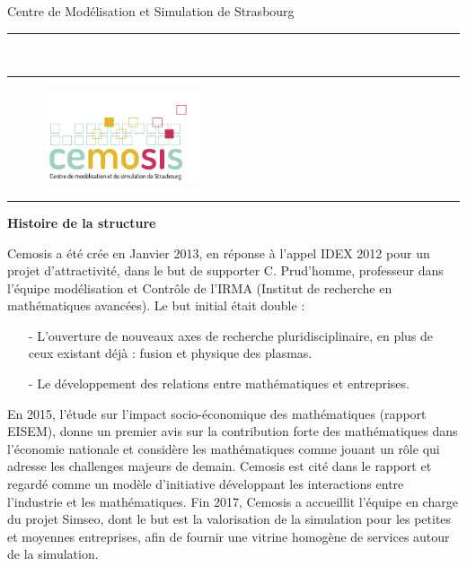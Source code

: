 \documentclass[10pt,a4paper]{article}
\newcommand{\HorRule}[1]{\noindent\rule{\linewidth}{#1}} %
\newcommand{\SepRule}{\noindent							 %
						\begin{center}
							\rule{250pt}{1pt}
						\end{center}
						}
\newcommand{\JournalName}[1]{%
		\begin{center}	
			\Huge 
			#1%
		\end{center}	
		\par \normalsize \normalfont}
\newcommand{\NewsItem}[1]{%
			
		\large \bfseries #1 \vspace{4pt}
		\par \normalsize \normalfont}
\begin{document}

\JournalName{Centre de Mod\'elisation et Simulation de Strasbourg}
\noindent\HorRule{3pt} \\[-0.75\baselineskip]
\HorRule{1pt}


\vspace{0.5cm}
\begin{figure}[h]

\begin{center}


		\includegraphics[width=0.42\textwidth]{images/cemosis}
		\\	%


\end{center}
\end{figure}


\vspace{0.5cm}
	\SepRule
\vspace{0.5cm}

	\NewsItem{Histoire de la structure}
 Cemosis a \'et\'e crée en Janvier 2013, en réponse à l'appel IDEX 2012 pour un projet d'attractivité, dans le but de supporter C. Prud'homme, professeur dans l'équipe modélisation et Contrôle de l'IRMA (Institut de recherche en mathématiques avancées). Le but initial était double : 
 \begin{itemize}
 	\item[-] L'ouverture de nouveaux axes de recherche pluridisciplinaire, en plus de ceux existant déjà : fusion et physique des plasmas.
 	\item[-] Le développement des relations entre mathématiques et entreprises.
 \end{itemize}
 
 En 2015, l'étude sur l'impact socio-économique des mathématiques (rapport EISEM), donne un premier avis sur la contribution forte des mathématiques dans l'économie nationale et considère les mathématiques comme jouant un rôle qui adresse les challenges majeurs de demain. Cemosis est cité dans le rapport et regardé comme un modèle d'initiative développant les interactions entre l'industrie et les mathématiques.
 Fin 2017, Cemosis a accueillit l'équipe en charge du projet Simseo, dont le but est la valorisation de la simulation pour les petites et moyennes entreprises, afin de fournir une vitrine homogène de services autour de la simulation.
 
\end{document}
